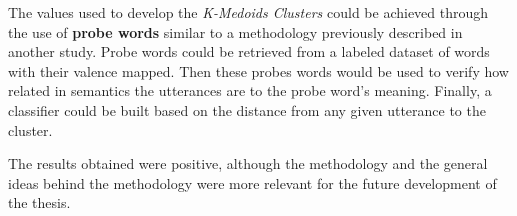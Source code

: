 \documentclass{Paper_Summary}
\begin{document}
    The values used to develop the \emph{K-Medoids Clusters} could be achieved through the use of \textbf{probe words} similar to a methodology previously described in another study. Probe words could be retrieved from a labeled dataset of words with their valence mapped. Then these probes words would be used to verify how related in semantics the utterances are to the probe word's meaning. Finally, a classifier could be built based on the distance from any given utterance to the cluster.

    The results obtained were positive, although the methodology and the general ideas behind the methodology were more relevant for the future development of the thesis.

\breakline
\end{document}
